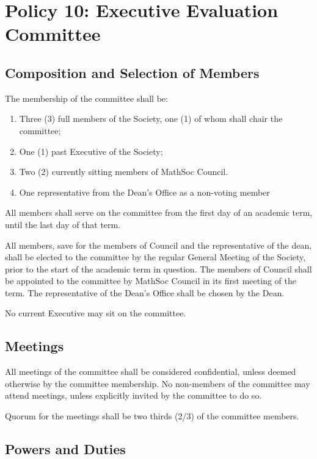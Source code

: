 \documentclass[12pt, letterpaper]{article}
\begin{document}
\section*{Policy 10: Executive Evaluation Committee}

\subsection*{Composition and Selection of Members}
The membership of the committee shall be:
\begin{enumerate}
	\item Three (3) full members of the Society, one (1) of whom shall chair the committee;
	\item One (1) past Executive of the Society;
	\item Two (2) currently sitting members of MathSoc Council.
	\item One representative from the Dean’s Office as a non-voting member
\end{enumerate}

All members shall serve on the committee from the first day of an academic term, until the last day of that term.

All members, save for the members of Council and the representative of the dean, shall be elected to the committee by the regular General Meeting of the Society, prior to the start of the academic term in question. The members of Council shall be appointed to the committee by MathSoc Council in its first meeting of the term. The representative of the Dean’s Office shall be chosen by the Dean.

No current Executive may sit on the committee.

\subsection*{Meetings}

All meetings of the committee shall be considered confidential, unless deemed otherwise by the committee membership. No non-members of the committee may attend meetings, unless explicitly invited by the committee to do so.

Quorum for the meetings shall be two thirds (2/3) of the committee members.

\subsection*{Powers and Duties}
\end{document}

